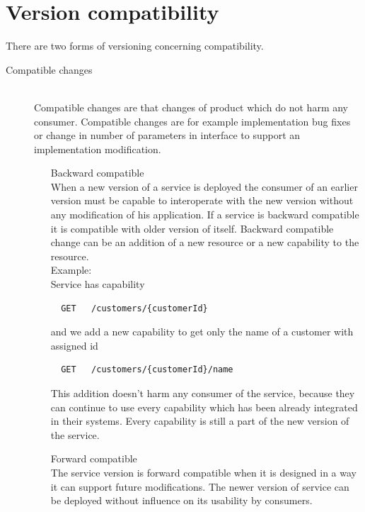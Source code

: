 \section{Version compatibility}
\label{sec:v-compat}
There are two forms of versioning concerning compatibility. \cite{website:service-versioning}
\begin{description}
  \item[Compatible changes] \hfill \\
  Compatible changes are that changes of product which do not harm any consumer. Compatible changes are for example implementation bug fixes or change in number of parameters in interface to support an implementation modification.
  \begin{enumerate}
    \item[Backward compatible] \hfill \\ 
  When a new version of a service is deployed the consumer of an earlier version must be capable to interoperate with the new version without any modification of his application. If a service is backward compatible it is compatible with older version of itself. Backward compatible change can be an addition of a new resource or a new capability to the resource. \hfill \\ 
  Example: \hfill \\ 
  Service has capability \hfill \\ 
  \begin{lstlisting}
  GET   /customers/{customerId}
  \end{lstlisting}
  and we add a new capability to get only the name of a customer with assigned id
  \begin{lstlisting}
  GET   /customers/{customerId}/name
  \end{lstlisting}

  This addition doesn't harm any consumer of the service, because they can continue to use every capability which has been already integrated in their systems. Every capability is still a part of the new version of the service. 
  
  \item[Forward compatible] \hfill \\
  The service version is forward compatible when it is designed in a way it can support future modifications. The newer version of service can be deployed without influence on its usability by consumers. 
  \end{enumerate}
  

\end{description}
